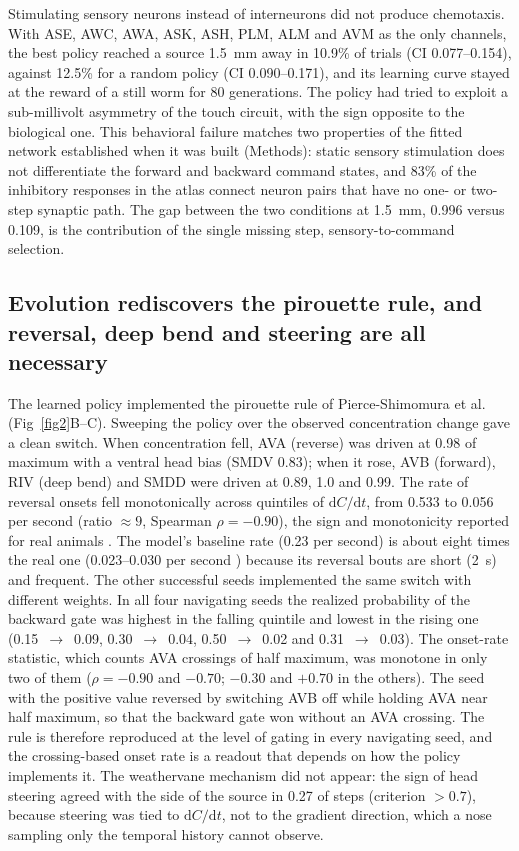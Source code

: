 \documentclass[11pt,a4paper]{article}
\begin{document}
Stimulating sensory neurons instead of interneurons did not produce chemotaxis. With ASE, AWC, AWA, ASK, ASH, PLM, ALM and AVM as the only channels, the best policy reached a source 1.5~mm away in 10.9\% of trials (CI 0.077--0.154), against 12.5\% for a random policy (CI 0.090--0.171), and its learning curve stayed at the reward of a still worm for 80 generations. The policy had tried to exploit a sub-millivolt asymmetry of the touch circuit, with the sign opposite to the biological one. This behavioral failure matches two properties of the fitted network established when it was built (Methods): static sensory stimulation does not differentiate the forward and backward command states, and 83\% of the inhibitory responses in the atlas connect neuron pairs that have no one- or two-step synaptic path. The gap between the two conditions at 1.5~mm, 0.996 versus 0.109, is the contribution of the single missing step, sensory-to-command selection.

\subsection*{Evolution rediscovers the pirouette rule, and reversal, deep bend and steering are all necessary}
The learned policy implemented the pirouette rule of Pierce-Shimomura et al.\ \cite{r9} (Fig~\ref{fig2}B--C). Sweeping the policy over the observed concentration change gave a clean switch. When concentration fell, AVA (reverse) was driven at 0.98 of maximum with a ventral head bias (SMDV 0.83); when it rose, AVB (forward), RIV (deep bend) and SMDD were driven at 0.89, 1.0 and 0.99. The rate of reversal onsets fell monotonically across quintiles of $\mathrm{d}C/\mathrm{d}t$, from 0.533 to 0.056 per second (ratio $\approx 9$, Spearman $\rho = -0.90$), the sign and monotonicity reported for real animals \cite{r9}. The model's baseline rate (0.23 per second) is about eight times the real one (0.023--0.030 per second \cite{r9}) because its reversal bouts are short (2~s) and frequent. The other successful seeds implemented the same switch with different weights. In all four navigating seeds the realized probability of the backward gate was highest in the falling quintile and lowest in the rising one (0.15~$\to$~0.09, 0.30~$\to$~0.04, 0.50~$\to$~0.02 and 0.31~$\to$~0.03). The onset-rate statistic, which counts AVA crossings of half maximum, was monotone in only two of them ($\rho = -0.90$ and $-0.70$; $-0.30$ and $+0.70$ in the others). The seed with the positive value reversed by switching AVB off while holding AVA near half maximum, so that the backward gate won without an AVA crossing. The rule is therefore reproduced at the level of gating in every navigating seed, and the crossing-based onset rate is a readout that depends on how the policy implements it. The weathervane mechanism \cite{r10} did not appear: the sign of head steering agreed with the side of the source in 0.27 of steps (criterion $>0.7$), because steering was tied to $\mathrm{d}C/\mathrm{d}t$, not to the gradient direction, which a nose sampling only the temporal history cannot observe.
\end{document}
